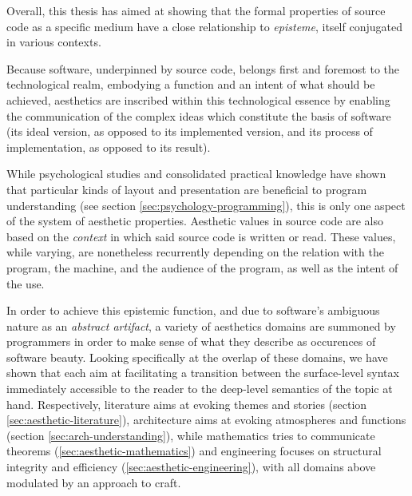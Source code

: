 Overall, this thesis has aimed at showing that the formal properties of source code as a specific medium have a close relationship to \emph{episteme}, itself conjugated in various contexts.

Because software, underpinned by source code, belongs first and foremost to the technological realm, embodying a function and an intent of what should be achieved, aesthetics are inscribed within this technological essence by enabling the communication of the complex ideas which constitute the basis of software (its ideal version, as opposed to its implemented version, and its process of implementation, as opposed to its result).

While psychological studies and consolidated practical knowledge have shown that particular kinds of layout and presentation are beneficial to program understanding (see section \ref{sec:psychology-programming}), this is only one aspect of the system of aesthetic properties. Aesthetic values in source code are also based on the \emph{context} in which said source code is written or read. These values, while varying, are nonetheless recurrently depending on the relation with the program, the machine, and the audience of the program, as well as the intent of the use.

In order to achieve this epistemic function, and due to software's ambiguous nature as an \emph{abstract artifact}, a variety of aesthetics domains are summoned by programmers in order to make sense of what they describe as occurences of software beauty. Looking specifically at the overlap of these domains, we have shown that each aim at facilitating a transition between the surface-level syntax immediately accessible to the reader to the deep-level semantics of the topic at hand. Respectively, literature aims at evoking themes and stories (section \ref{sec:aesthetic-literature}), architecture aims at evoking atmospheres and functions (section \ref{sec:arch-understanding}), while mathematics tries to communicate theorems (\ref{sec:aesthetic-mathematics}) and engineering focuses on structural integrity and efficiency (\ref{sec:aesthetic-engineering}), with all domains above modulated by an approach to craft.

